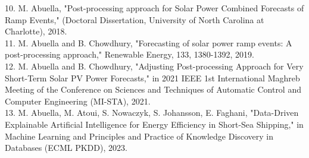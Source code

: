 \documentclass[11pt,letterpaper,sans]{moderncv}
\begin{document}
10. M. Abuella, "Post-processing approach for Solar Power Combined Forecasts of Ramp Events," (Doctoral Dissertation, University of North Carolina at Charlotte), 2018.\\
11. M. Abuella and B. Chowdhury, "Forecasting of solar power ramp events: A post-processing approach," Renewable Energy, 133, 1380-1392, 2019.\\
12. M. Abuella and B. Chowdhury, "Adjusting Post-processing Approach for Very Short-Term Solar PV Power Forecasts," in 2021 IEEE 1st International Maghreb Meeting of the Conference on Sciences and Techniques of Automatic Control and Computer Engineering (MI-STA), 2021.\\
13. M. Abuella, M. Atoui, S. Nowaczyk, S. Johansson, E. Faghani, "Data-Driven Explainable Artificial Intelligence for Energy Efficiency in Short-Sea Shipping," in Machine Learning and Principles and Practice of Knowledge Discovery in Databases (ECML PKDD), 2023.




\end{document}
